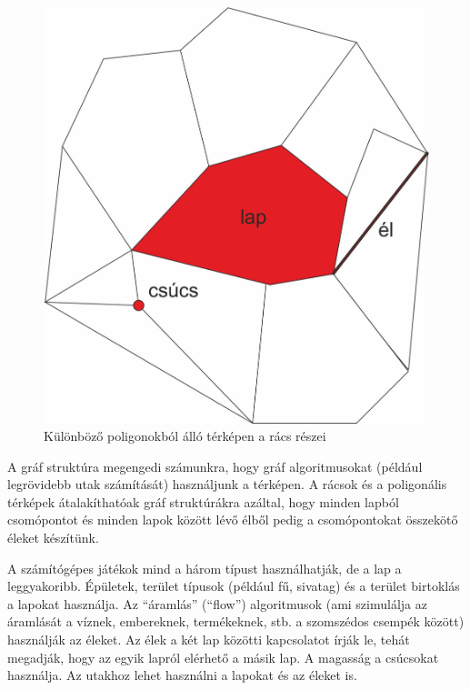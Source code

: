 \begin{figure}[h!]
\centering
\includegraphics[scale=0.4]{kepek/PartsOfGrid2.jpg}
\caption{Különböző poligonokból álló térképen a rács részei}
\label{fig:PartsOfGrid2}
\end{figure}

A gráf struktúra megengedi számunkra, hogy gráf algoritmusokat (például legrövidebb utak számítását) használjunk a térképen. A rácsok és a poligonális térképek átalakíthatóak gráf struktúrákra azáltal, hogy minden lapból csomópontot és minden lapok között lévő élből pedig a csomópontokat összekötő éleket készítünk.


A számítógépes játékok mind a három típust használhatják, de a lap a leggyakoribb. Épületek, terület típusok (például fű, sivatag) és a terület birtoklás a lapokat használja. Az “áramlás” (“flow”) algoritmusok (ami szimulálja az áramlását a víznek, embereknek, termékeknek, stb. a szomszédos csempék között) használják az éleket. Az élek a két lap közötti kapcsolatot írják le, tehát megadják, hogy az egyik lapról elérhető a másik lap. A magasság a csúcsokat használja. Az utakhoz lehet használni a lapokat és az éleket is.

